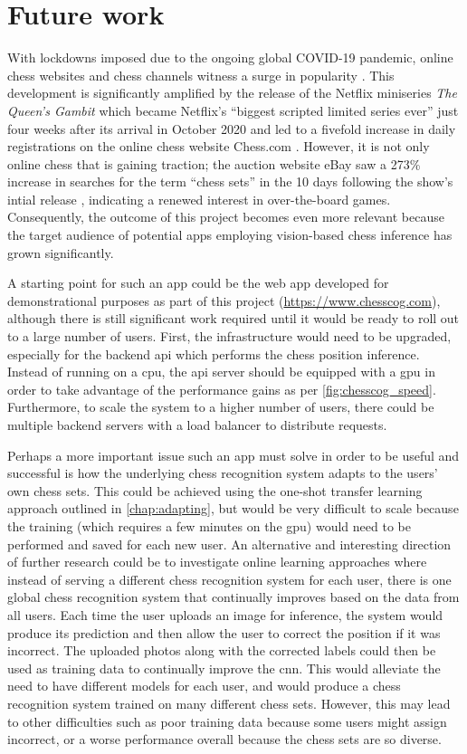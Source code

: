 \documentclass[../main.tex]{subfiles}
\begin{document}
\section{Future work}
With lockdowns imposed due to the ongoing global COVID-19 pandemic, online chess websites and chess channels witness a surge in popularity \cite{dottle2020}.
This development is significantly amplified by the release of the Netflix miniseries \textit{The Queen's Gambit} which became Netflix's ``biggest scripted limited series ever'' \cite{friedlander2020} just four weeks after its arrival in October 2020 and led to a fivefold increase in daily registrations on the online chess website Chess.com \cite{dottle2020}.
However, it is not only online chess that is gaining traction; the auction website eBay saw a 273\% increase in searches for the term ``chess sets'' in the 10 days following the show's intial release \cite{young2020}, indicating a renewed interest in over-the-board games.
Consequently, the outcome of this project becomes even more relevant because the target audience of potential apps employing vision-based chess inference has grown significantly.

A starting point for such an app could be the web app developed for demonstrational purposes as part of this project (\url{https://www.chesscog.com}), although there is still significant work required until it would be ready to roll out to a large number of users.
First, the infrastructure would need to be upgraded, especially for the backend \gls{api} which performs the chess position inference.
Instead of running on a \gls{cpu}, the \gls{api} server should be equipped with a \gls{gpu} in order to take advantage of the performance gains as per \cref{fig:chesscog_speed}.
Furthermore, to scale the system to a higher number of users, there could be multiple backend servers with a load balancer to distribute requests.

Perhaps a more important issue such an app must solve in order to be useful and successful is how the underlying chess recognition system adapts to the users' own chess sets.
This could be achieved using the one-shot transfer learning approach outlined in \cref{chap:adapting}, but would be very difficult to scale because the training (which requires a few minutes on the \gls{gpu}) would need to be performed and saved for each new user.
An alternative and interesting direction of further research could be to investigate online learning approaches where instead of serving a different chess recognition system for each user, there is one global chess recognition system that continually improves based on the data from all users.
Each time the user uploads an image for inference, the system would produce its prediction and then allow the user to correct the position if it was incorrect.
The uploaded photos along with the corrected labels could then be used as training data to continually improve the \gls{cnn}.
This would alleviate the need to have different models for each user, and would produce a chess recognition system trained on many different chess sets.
However, this may lead to other difficulties such as poor training data because some users might assign incorrect, or a worse performance overall because the chess sets are so diverse.
\end{document}
